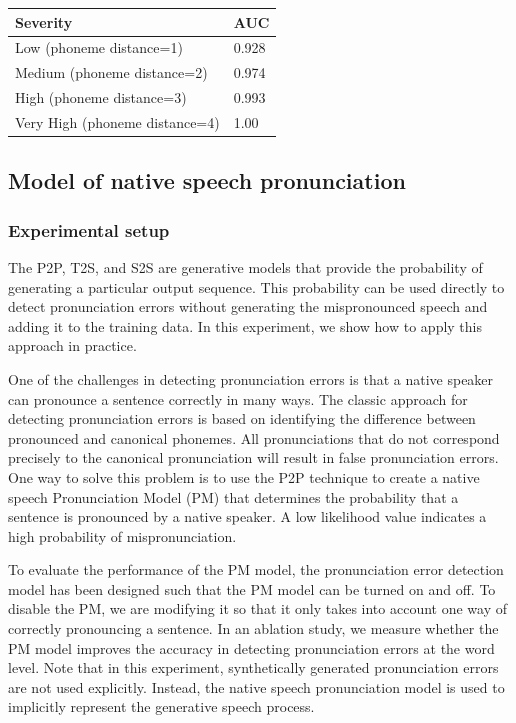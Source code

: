 \documentclass[]{interact}
\theoremstyle{plain}%
\theoremstyle{definition}
\theoremstyle{remark}
\begin{document}
\begin{table}
  {
  \centering
   \begin{tabular}{ll}
    \toprule
     Severity & AUC \\
    \midrule
    Low (phoneme distance=1) & 0.928\\   
    Medium (phoneme distance=2) & 0.974 \\  
    High (phoneme distance=3) & 0.993 \\  
    Very High (phoneme distance=4) & 1.00 \\ 
    \bottomrule
  \end{tabular}
  }
  \label{tab:speech_to_speech_auc_synth_speech}
\end{table}

\subsection{Model of native speech pronunciation}

\subsubsection{Experimental setup}

The P2P, T2S, and S2S are generative models that provide the probability of generating a particular output sequence. This probability can be used directly to detect pronunciation errors without generating the mispronounced speech and adding it to the training data. In this experiment, we show how to apply this approach in practice.

One of the challenges in detecting pronunciation errors is that a native speaker can pronounce a sentence correctly in many ways. The classic approach for detecting pronunciation errors is based on identifying the difference between pronounced and canonical phonemes. All pronunciations that do not correspond precisely to the canonical pronunciation will result in false pronunciation errors. One way to solve this problem is to use the P2P technique to create a native speech Pronunciation Model (PM) that determines the probability that a sentence is pronounced by a native speaker. A low likelihood value indicates a high probability of mispronunciation. 

To evaluate the performance of the PM model, the pronunciation error detection model has been designed such that the PM model can be turned on and off. To disable the PM, we are modifying  it so that it only takes into account  one way of correctly pronouncing a sentence. In an ablation study, we measure  whether the PM model improves the accuracy in detecting pronunciation errors at the word level. Note that in this experiment, synthetically generated pronunciation errors are not used explicitly. Instead, the native speech pronunciation model is used to implicitly represent the generative speech process. 
\end{document}

